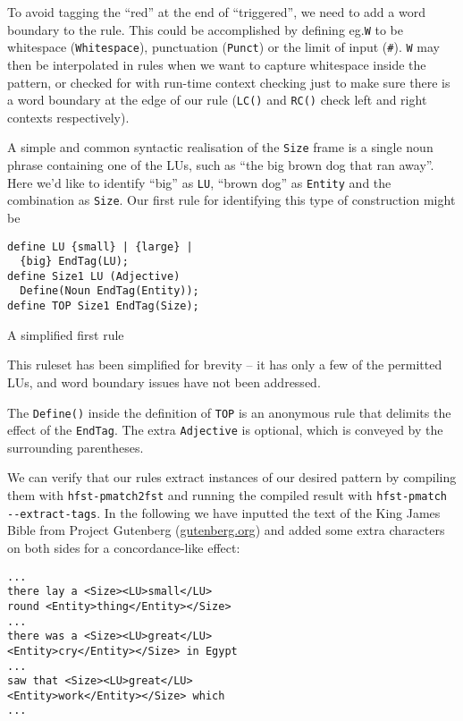 \documentclass[11pt]{article}
\begin{document}
To avoid tagging the ``red'' at the end of ``triggered'', we need to add a word
boundary to the rule. This could be accomplished by defining eg.\@ \verb+W+ to
be whitespace (\verb+Whitespace+), punctuation (\verb+Punct+) or the limit of
input (\verb+#+). \verb+W+ may then be interpolated
in rules when we want to capture whitespace inside the pattern, or checked for
with run-time context checking just to make sure there is a word boundary at the
edge of our rule (\verb+LC()+ and \verb+RC()+ check left and right contexts
respectively).

A simple and common syntactic realisation of the \verb+Size+ frame is a single
noun phrase containing one of the LUs, such as
``the big brown dog that ran away''. Here we'd like to identify ``big'' as \verb+LU+,
``brown dog'' as \verb+Entity+ and the combination as \verb+Size+.
Our first rule for identifying this type of construction might be

\begin{table}[h]
  \small
  \begin{framed}
\begin{verbatim}
define LU {small} | {large} |
  {big} EndTag(LU);
define Size1 LU (Adjective)
  Define(Noun EndTag(Entity));
define TOP Size1 EndTag(Size);  
\end{verbatim}
\end{framed}
\normalsize
\caption{A simplified first rule}
\end{table}

This ruleset has been simplified for brevity -- it has only a few of the
permitted LUs, and word boundary issues have not been addressed.

The \verb+Define()+ inside the definition of \verb+TOP+ is an anonymous rule
that delimits the effect of the \verb+EndTag+. The extra \verb+Adjective+ is
optional, which is conveyed by the surrounding parentheses.

We can verify that our rules extract instances of our desired pattern by compiling
them with \verb+hfst-pmatch2fst+ and running the compiled result with
\verb+hfst-pmatch --extract-tags+. In the following we have
inputted the text of the King James Bible from Project
Gutenberg (\url{gutenberg.org}) and added some extra characters on both
sides for
a concordance-like effect:

\hfill \break
  \small
  \begin{framed}
\begin{verbatim}
...
there lay a <Size><LU>small</LU>
round <Entity>thing</Entity></Size>
...
there was a <Size><LU>great</LU>
<Entity>cry</Entity></Size> in Egypt
...
saw that <Size><LU>great</LU>
<Entity>work</Entity></Size> which
...
\end{verbatim}
\end{framed}
\normalsize
\end{document}
